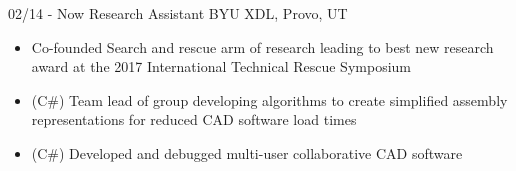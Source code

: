 \documentclass[]{friggeri-cv}
\begin{document}
\begin{entrylist}
  \entry
    {02/14 - Now}
    {Research Assistant}
    {BYU XDL, Provo, UT}
    {\vspace{-4mm}
    \begin{itemize}
        \item Co-founded Search and rescue arm of research leading to best new research award at the 2017 International Technical Rescue Symposium
        \item (C\#) Team lead of group developing algorithms to create simplified assembly representations for reduced CAD software load times
        \item (C\#) Developed and debugged multi-user collaborative CAD software
    \end{itemize}\vspace{1mm}}


\end{entrylist}
\end{document}
